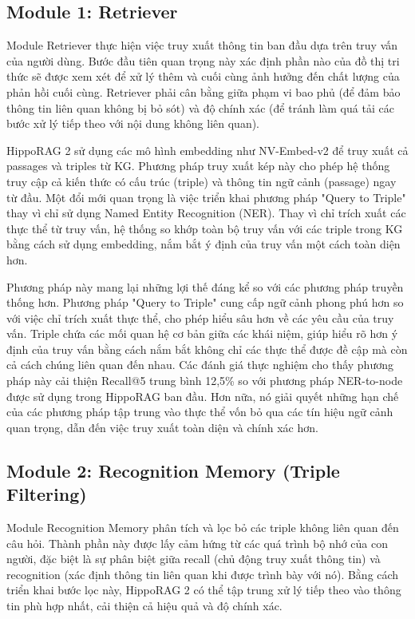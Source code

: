 \documentclass[../main.tex]{subfiles}
\begin{document}
\subsection{Module 1: Retriever}
Module Retriever thực hiện việc truy xuất thông tin ban đầu dựa trên truy vấn của người dùng. Bước đầu tiên quan trọng này xác định phần nào của đồ thị tri thức sẽ được xem xét để xử lý thêm và cuối cùng ảnh hưởng đến chất lượng của phản hồi cuối cùng. Retriever phải cân bằng giữa phạm vi bao phủ (để đảm bảo thông tin liên quan không bị bỏ sót) và độ chính xác (để tránh làm quá tải các bước xử lý tiếp theo với nội dung không liên quan).

HippoRAG 2 sử dụng các mô hình embedding như NV-Embed-v2 để truy xuất cả passages và triples từ KG. Phương pháp truy xuất kép này cho phép hệ thống truy cập cả kiến thức có cấu trúc (triple) và thông tin ngữ cảnh (passage) ngay từ đầu. Một đổi mới quan trọng là việc triển khai phương pháp "Query to Triple" thay vì chỉ sử dụng Named Entity Recognition (NER). Thay vì chỉ trích xuất các thực thể từ truy vấn, hệ thống so khớp toàn bộ truy vấn với các triple trong KG bằng cách sử dụng embedding, nắm bắt ý định của truy vấn một cách toàn diện hơn.

Phương pháp này mang lại những lợi thế đáng kể so với các phương pháp truyền thống hơn. Phương pháp "Query to Triple" cung cấp ngữ cảnh phong phú hơn so với việc chỉ trích xuất thực thể, cho phép hiểu sâu hơn về các yêu cầu của truy vấn. Triple chứa các mối quan hệ cơ bản giữa các khái niệm, giúp hiểu rõ hơn ý định của truy vấn bằng cách nắm bắt không chỉ các thực thể được đề cập mà còn cả cách chúng liên quan đến nhau. Các đánh giá thực nghiệm cho thấy phương pháp này cải thiện Recall@5 trung bình 12,5\% so với phương pháp NER-to-node được sử dụng trong HippoRAG ban đầu. Hơn nữa, nó giải quyết những hạn chế của các phương pháp tập trung vào thực thể vốn bỏ qua các tín hiệu ngữ cảnh quan trọng, dẫn đến việc truy xuất toàn diện và chính xác hơn.

\subsection{Module 2: Recognition Memory (Triple Filtering)}
Module Recognition Memory phân tích và lọc bỏ các triple không liên quan đến câu hỏi. Thành phần này được lấy cảm hứng từ các quá trình bộ nhớ của con người, đặc biệt là sự phân biệt giữa recall (chủ động truy xuất thông tin) và recognition (xác định thông tin liên quan khi được trình bày với nó). Bằng cách triển khai bước lọc này, HippoRAG 2 có thể tập trung xử lý tiếp theo vào thông tin phù hợp nhất, cải thiện cả hiệu quả và độ chính xác.
\end{document}
